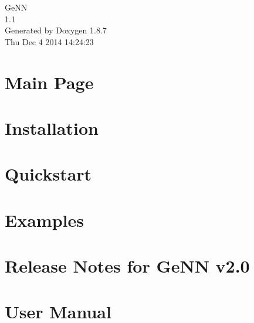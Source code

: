 \documentclass[twoside]{book}
\newcommand{\+}{\discretionary{\mbox{\scriptsize$\hookleftarrow$}}{}{}}
\newcommand{\clearemptydoublepage}{%
  \newpage{\pagestyle{empty}\cleardoublepage}%
}
\begin{document}
\hypersetup{pageanchor=false,
             bookmarks=true,
             bookmarksnumbered=true,
             pdfencoding=unicode
            }
\begin{titlepage}
\vspace*{7cm}
\begin{center}%
{\Large Ge\+N\+N \\[1ex]\large 1.\+1 }\\
\vspace*{1cm}
{\large Generated by Doxygen 1.8.7}\\
\vspace*{0.5cm}
{\small Thu Dec 4 2014 14:24:23}\\
\end{center}
\end{titlepage}
\clearemptydoublepage
\tableofcontents
\clearemptydoublepage
{}
\hypersetup{pageanchor=true}

\chapter{Main Page}
\label{index}\hypertarget{index}{}
\chapter{Installation}
\label{d8/d99/Installation}
\hypertarget{d8/d99/Installation}{}

\chapter{Quickstart}
\label{d7/d98/Quickstart}
\hypertarget{d7/d98/Quickstart}{}

\chapter{Examples}
\label{d9/d61/Examples}
\hypertarget{d9/d61/Examples}{}

\chapter{Release Notes for Ge\+N\+N v2.0}
\label{df/ddb/ReleaseNotes}
\hypertarget{df/ddb/ReleaseNotes}{}

\chapter{User Manual}
\label{dc/d05/UserManual}
\hypertarget{dc/d05/UserManual}{}

\end{document}
